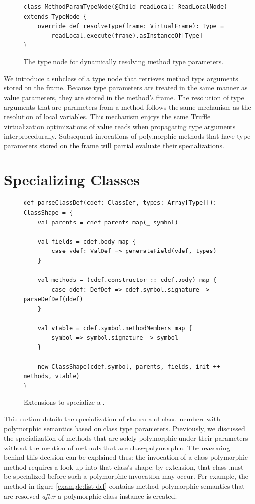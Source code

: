 \begin{figure}[!htb]
\begin{verbatim}
class MethodParamTypeNode(@Child readLocal: ReadLocalNode) extends TypeNode {
	override def resolveType(frame: VirtualFrame): Type = 
		readLocal.execute(frame).asInstanceOf[Type]
}
\end{verbatim}
\caption{The type node for dynamically resolving method type parameters.}
\label{impl:method-param-typenode}
\end{figure}

We introduce a subclass of a type node that retrieves method type arguments stored on the frame.
Because type parameters are treated in the same manner as value parameters, they are stored in the method's frame.
The resolution of type arguments that are parameters from a method follows the same mechanism as the resolution of local variables.
This mechanism enjoys the same Truffle virtualization optimizations of value reads when propagating type arguments interprocedurally.
Subsequent invocations of polymorphic methods that have type parameters stored on the frame will partial evaluate their specializations.

\section{Specializing Classes}

\begin{figure}[!htb]
\begin{verbatim}
def parseClassDef(cdef: ClassDef, types: Array[Type]]): ClassShape = {
	val parents = cdef.parents.map(_.symbol)
		
	val fields = cdef.body map {
		case vdef: ValDef => generateField(vdef, types)	
	}
	
	val methods = (cdef.constructor :: cdef.body) map {
		case ddef: DefDef => ddef.symbol.signature -> parseDefDef(ddef)
	}
		
	val vtable = cdef.symbol.methodMembers map {
		symbol => symbol.signature -> symbol
	}
		
	new ClassShape(cdef.symbol, parents, fields, init ++ methods, vtable)
}
\end{verbatim}
\caption{Extensions to specialize a .}
\label{impl:specialize-class}
\end{figure}

This section details the specialization of classes and class members with polymorphic semantics based on class type parameters.
Previously, we discussed the specialization of methods that are solely polymorphic under their parameters without the mention of methods that are class-polymorphic.
The reasoning behind this decision can be explained thus: the invocation of a class-polymorphic method requires a look up into that class's shape; by extension, that class must be specialized before such a polymorphic invocation may occur.
For example, the method  in figure \ref{example:list-def} contains method-polymorphic semantics that are resolved \textit{after} a polymorphic class instance is created.

